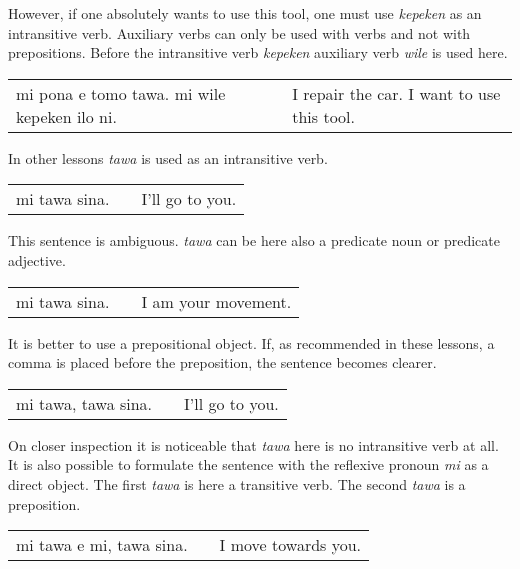 However, if one absolutely wants to use this tool, one must use \textit{kepeken} as an intransitive verb. 
Auxiliary verbs can only be used with verbs and not with prepositions. 
Before the intransitive verb \textit{kepeken} auxiliary verb \textit{wile} is used here. 

\begin{supertabular}{p{5,5cm}|ll}
mi pona e tomo tawa. mi wile kepeken ilo ni. && I repair the car. I want to use this tool. \\
\end{supertabular} 

%
%
In other lessons \textit{tawa} is used as an intransitive verb.

\begin{supertabular}{p{5,5cm}|ll}
mi tawa sina. && I'll go to you. \\ %
\end{supertabular} 

This sentence is ambiguous. 
\textit{tawa} can be here also a predicate noun or predicate adjective. 

\begin{supertabular}{p{5,5cm}|ll}
mi tawa sina. && I am your movement. \\ %
\end{supertabular} 

It is better to use a prepositional object.
If, as recommended in these lessons, a comma is placed before the preposition, the sentence becomes clearer.

\begin{supertabular}{p{5,5cm}|ll}
mi tawa, tawa sina. && I'll go to you. \\ 
\end{supertabular} 

On closer inspection it is noticeable that \textit{tawa} here is no intransitive verb at all.
It is also possible to formulate the sentence with the reflexive pronoun \textit{mi} as a direct object. 
The first \textit{tawa} is here a transitive verb. 
The second \textit{tawa} is a preposition. 

\begin{supertabular}{p{5,5cm}|ll}
mi tawa e mi, tawa sina. && I move towards you. \\ %
\end{supertabular} 

%
\newpage
%
